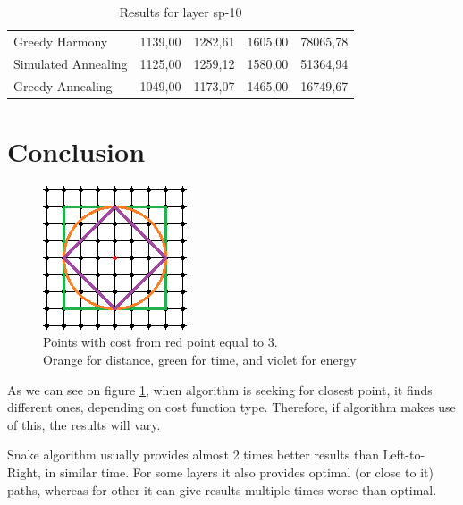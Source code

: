 \documentclass[titlepage]{article}
\begin{document}
\begin{table}[H]
\begin{center}
\begin{tabular}{|m{4cm}||r|r|r|r|}
			\\ \cline{2-5}
			
			Greedy Harmony & 1139,00	& 1282,61	& 1605,00& 	78065,78
			
			\\ \cline{2-5}
			
			Simulated Annealing & 1125,00	& 1259,12	& 1580,00	& 51364,94
			
			\\ \cline{2-5}
			
			Greedy Annealing & \cellcolor{yellow!50}1049,00	& 1173,07& 	\cellcolor{yellow!50}1465,00	& 16749,67
			
			\\ \hline
			
		\end{tabular}
		\caption{Results for layer sp-10}
		\label{tab:results-sp-10}
	\end{center}
\end{table}

\section{Conclusion}
\begin{figure}
\begin{center}
\includegraphics[scale=2]{img/costs}
\end{center}
\caption{Points with cost from red point equal to 3.\\Orange for distance, green for time, and violet for energy}
\label{cost_function_representation}
\end{figure}
As we can see on figure \ref{cost_function_representation}, when algorithm is seeking for closest point, it finds different ones, depending on cost function type. Therefore, if algorithm makes use of this, the results will vary.

Snake algorithm usually provides almost 2 times better results than Left-to-Right, in similar time. For some layers it also provides optimal (or close to it) paths, whereas for other it can give results multiple times worse than optimal.
\end{document}
